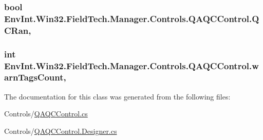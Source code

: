 \subsubsection[{Q\+C\+Ran}]{\setlength{\rightskip}{0pt plus 5cm}bool Env\+Int.\+Win32.\+Field\+Tech.\+Manager.\+Controls.\+Q\+A\+Q\+C\+Control.\+Q\+C\+Ran\hspace{0.3cm}{\ttfamily [get]}, {\ttfamily [set]}}\label{class_env_int_1_1_win32_1_1_field_tech_1_1_manager_1_1_controls_1_1_q_a_q_c_control_a478d355f4c1bdacb8d408a86ea5589dd}
\hypertarget{class_env_int_1_1_win32_1_1_field_tech_1_1_manager_1_1_controls_1_1_q_a_q_c_control_a563bd57346973fb6dd1f89a50b5f78fc}{}
\subsubsection[{warn\+Tags\+Count}]{\setlength{\rightskip}{0pt plus 5cm}int Env\+Int.\+Win32.\+Field\+Tech.\+Manager.\+Controls.\+Q\+A\+Q\+C\+Control.\+warn\+Tags\+Count\hspace{0.3cm}{\ttfamily [get]}, {\ttfamily [set]}}\label{class_env_int_1_1_win32_1_1_field_tech_1_1_manager_1_1_controls_1_1_q_a_q_c_control_a563bd57346973fb6dd1f89a50b5f78fc}


The documentation for this class was generated from the following files\+:\begin{DoxyCompactItemize}
\item 
Controls/\hyperlink{_q_a_q_c_control_8cs}{Q\+A\+Q\+C\+Control.\+cs}\item 
Controls/\hyperlink{_q_a_q_c_control_8_designer_8cs}{Q\+A\+Q\+C\+Control.\+Designer.\+cs}\end{DoxyCompactItemize}
